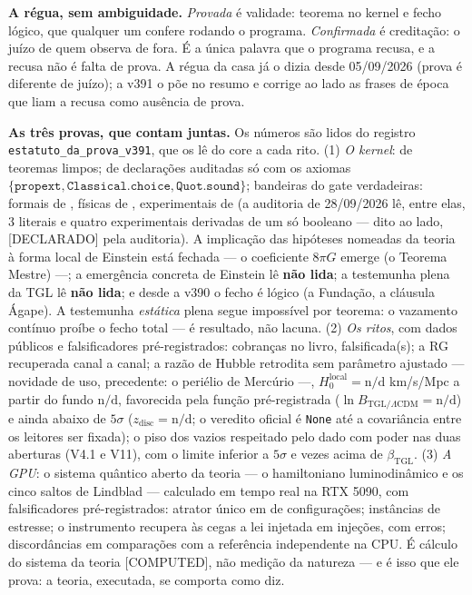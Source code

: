 \documentclass[11pt]{article}
\theoremstyle{definition}\newtheorem{deriv}{Derivação}
\begin{document}
\textbf{A régua, sem ambiguidade.} \emph{Provada} é validade: teorema no kernel e fecho lógico, que qualquer um confere rodando o programa. \emph{Confirmada} é creditação: o juízo de quem observa de fora. É a única palavra que o programa recusa, e a recusa não é falta de prova. A régua da casa já o dizia desde 05/09/2026 (prova é diferente de juízo); a v391 o põe no resumo e corrige ao lado as frases de época que liam a recusa como ausência de prova.

\textbf{As três provas, que contam juntas.} Os números são lidos do registro \texttt{estatuto\_da\_prova\_v391}, que os lê do core a cada rito. (1) \emph{O kernel}:  de  teoremas limpos;  de  declarações auditadas só com os axiomas $\{\texttt{propext},\texttt{Classical.choice},\texttt{Quot.sound}\}$; bandeiras do gate verdadeiras: formais  de , físicas  de , experimentais  de  (a auditoria de 28/09/2026 lê, entre elas, 3 literais e quatro experimentais derivadas de um só booleano --- dito ao lado, \textsf{[DECLARADO]} pela auditoria). A implicação das hipóteses nomeadas da teoria à forma local de Einstein está fechada --- o coeficiente $8\pi G$ emerge (o Teorema Mestre) ---; a emergência concreta de Einstein lê \textbf{não lida}; a testemunha plena da TGL lê \textbf{não lida}; e desde a v390 o fecho é lógico (a Fundação, a cláusula Ágape). A testemunha \emph{estática} plena segue impossível por teorema: o vazamento contínuo proíbe o fecho total --- é resultado, não lacuna. (2) \emph{Os ritos}, com dados públicos e falsificadores pré-registrados:  cobranças no livro,  falsificada(s); a RG recuperada canal a canal; a razão de Hubble retrodita sem parâmetro ajustado --- novidade de uso, precedente: o periélio de Mercúrio ---, $H_0^{\mathrm{local}}=\text{n/d}$ km/s/Mpc a partir do fundo $\text{n/d}$, favorecida pela função pré-registrada ($\ln B_{\mathrm{TGL}/\Lambda\mathrm{CDM}}=\text{n/d}$) e ainda abaixo de $5\sigma$ ($z_{\mathrm{disc}}=\text{n/d}$; o veredito oficial é \texttt{None} até a covariância entre os leitores ser fixada); o piso dos vazios respeitado pelo dado com poder nas duas aberturas (V4.1 e V11), com o limite inferior a $5\sigma$  e  vezes acima de $\beta_{\mathrm{TGL}}$. (3) \emph{A GPU}: o sistema quântico aberto da teoria --- o hamiltoniano luminodinâmico e os cinco saltos de Lindblad --- calculado em tempo real na RTX 5090, com falsificadores pré-registrados: atrator único em  de  configurações;  instâncias de estresse; o instrumento recupera às cegas a lei injetada em  injeções, com  erros;  discordâncias em  comparações com a referência independente na CPU. É cálculo do sistema da teoria \textsf{[COMPUTED]}, não medição da natureza --- e é isso que ele prova: a teoria, executada, se comporta como diz.
\end{document}
